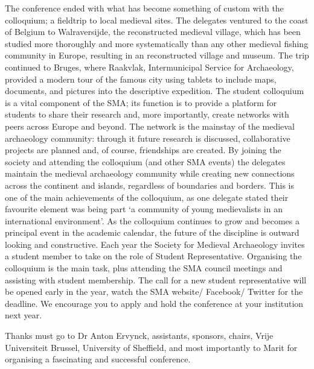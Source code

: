 \documentclass[%
	]{ijsra}
\begin{document}
The conference ended with what has become something of custom with the colloquium; a fieldtrip to local medieval sites. The delegates ventured to the coast of Belgium to Walraversijde, the reconstructed medieval village, which has been studied more thoroughly and more systematically than any other medieval fishing community in Europe, resulting in an reconstructed village and museum. The trip continued to Bruges, where Raakvlak, Intermunicipal Service for Archaeology, provided a modern tour of the famous city using tablets to include maps, documents, and pictures into the descriptive expedition. 
The student colloquium is a vital component of the SMA; its function is to provide a platform for students to share their research and, more importantly, create networks with peers across Europe and beyond. The network is the mainstay of the medieval archaeology community: through it future research is discussed, collaborative projects are planned and, of course, friendships are created. By joining the society and attending the colloquium (and other SMA events) the delegates maintain the medieval archaeology community while creating new connections across the continent and islands, regardless of boundaries and borders. This is one of the main achievements of the colloquium, as one delegate stated their favourite element was being part ‘a community of young medievalists in an international environment’. As the colloquium continues to grow and becomes a principal event in the academic calendar, the future of the discipline is outward looking and constructive.
Each year the Society for Medieval Archaeology invites a student member to take on the role of Student Representative. Organising the colloquium is the main task, plus attending the SMA council meetings and assisting with student membership. The call for a new student representative will be opened early in the year, watch the SMA website/ Facebook/ Twitter for the deadline. We encourage you to apply and hold the conference at your institution next year.

Thanks must go to Dr Anton Ervynck, assistants, sponsors, chairs, Vrije Universiteit Brussel, University of Sheffield, and most importantly to Marit for organising a fascinating and successful conference.


\iffalse
\IJSRAsection{small headline}

\IJSRAseparator
\fi

\IJSRAclosing%
\end{document}
